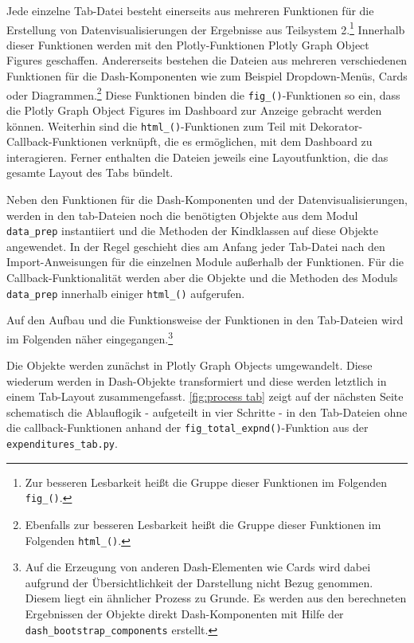     Jede einzelne Tab-Datei besteht einerseits aus mehreren Funktionen für die Erstellung von Datenvisualisierungen der
    Ergebnisse aus Teilsystem 2.\footnote{ Zur besseren Lesbarkeit heißt die Gruppe dieser Funktionen im Folgenden \texttt{fig\_()}.}
    Innerhalb dieser Funktionen werden mit den Plotly-Funktionen Plotly Graph Object Figures geschaffen. 
    Andererseits bestehen die Dateien aus mehreren verschiedenen Funktionen für die Dash-Komponenten wie zum Beispiel Dropdown-Menüs, Cards oder Diagrammen.\footnote{ Ebenfalls zur besseren Lesbarkeit
    heißt die Gruppe dieser Funktionen im Folgenden \texttt{html\_()}.}
    Diese Funktionen binden die \texttt{fig\_()}-Funktionen so ein, dass die Plotly Graph Object Figures im Dashboard zur Anzeige gebracht werden können. 
    Weiterhin sind die \texttt{html\_()}-Funktionen zum Teil mit Dekorator-Callback-Funktionen verknüpft, die es ermöglichen, mit dem Dashboard zu interagieren. 
    Ferner enthalten die Dateien jeweils eine Layoutfunktion, die das gesamte Layout des Tabs bündelt.

    Neben den Funktionen für die Dash-Komponenten und der Datenvisualisierungen, werden in den tab-Dateien noch die benötigten Objekte aus dem Modul \texttt{data\_prep} 
    instantiiert und die Methoden der Kindklassen auf diese Objekte angewendet. In der Regel geschieht dies am Anfang 
    jeder Tab-Datei nach den Import-Anweisungen für die einzelnen Module außerhalb der Funktionen. Für die Callback-Funktionalität werden aber die Objekte und die Methoden des Moduls \texttt{data\_prep} innerhalb einiger \texttt{html\_()} aufgerufen.
    
    Auf den Aufbau und die Funktionsweise der Funktionen in den Tab-Dateien wird im Folgenden näher eingegangen.\footnote{ Auf die Erzeugung von anderen Dash-Elementen wie Cards wird dabei aufgrund der Übersichtlichkeit der Darstellung nicht Bezug genommen. Diesem liegt ein ähnlicher Prozess
    zu Grunde. Es werden aus den berechneten Ergebnissen der Objekte direkt Dash-Komponenten mit Hilfe der \texttt{dash\_bootstrap\_components} erstellt.}
    
    Die Objekte werden zunächst in Plotly Graph Objects umgewandelt. Diese wiederum werden in Dash-Objekte transformiert und diese werden 
    letztlich in einem Tab-Layout zusammengefasst.
    \autoref{fig:process tab} zeigt auf der nächsten Seite schematisch die Ablauflogik - aufgeteilt in vier Schritte - in den Tab-Dateien ohne die callback-Funktionen anhand der 
    \texttt{fig\_total\_expnd()}-Funktion aus der \texttt{expenditures\_tab.py}.
    
